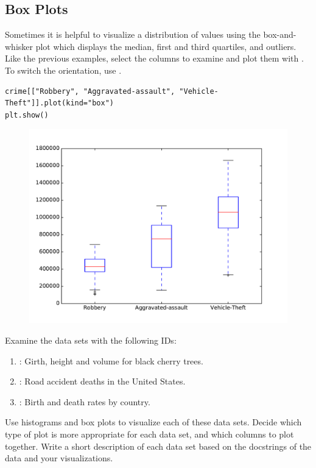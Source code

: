 \subsection*{Box Plots}

Sometimes it is helpful to visualize a distribution of values using the box-and-whisker plot which displays the median, first and third quartiles, and outliers.
Like the previous examples, select the columns to examine and plot them with .
To switch the orientation, use .

\begin{lstlisting}
crime[["Robbery", "Aggravated-assault", "Vehicle-Theft"]].plot(kind="box")
plt.show()
\end{lstlisting}

\begin{figure}[H] %
    \centering
    \includegraphics[width=.75\textwidth]{box1.pdf}
    \label{fig:box}
\end{figure}


\begin{problem}
Examine the data sets with the following  IDs:
\begin{enumerate}
\item {}: Girth, height and volume for black cherry trees.
\item {}: Road accident deaths in the United States.
\item {}: Birth and death rates by country.
\end{enumerate}
Use histograms and box plots to visualize each of these data sets.
Decide which type of plot is more appropriate for each data set, and which columns to plot together.
Write a short description of each data set based on the docstrings of the data and your visualizations.
\end{problem}

